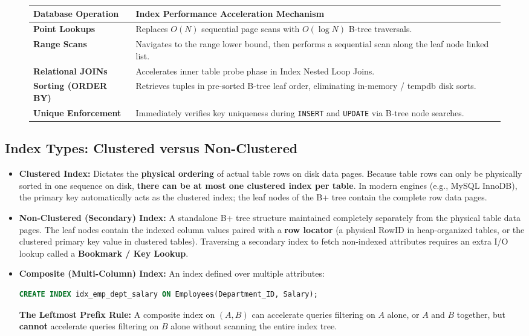 \begin{figure}[htbp]
\centering
\small
\begin{tabularx}{\textwidth}{p{3.5cm} X}
\toprule
\textbf{Database Operation} & \textbf{Index Performance Acceleration Mechanism} \\
\midrule
\textbf{Point Lookups} & Replaces $O(N)$ sequential page scans with $O(\log N)$ B-tree traversals. \\
\textbf{Range Scans} & Navigates to the range lower bound, then performs a sequential scan along the leaf node linked list. \\
\textbf{Relational JOINs} & Accelerates inner table probe phase in Index Nested Loop Joins. \\
\textbf{Sorting (ORDER BY)} & Retrieves tuples in pre-sorted B-tree leaf order, eliminating in-memory / tempdb disk sorts. \\
\textbf{Unique Enforcement} & Immediately verifies key uniqueness during \texttt{INSERT} and \texttt{UPDATE} via B-tree node searches. \\
\bottomrule
\end{tabularx}
\end{figure}

\subsection{Index Types: Clustered versus Non-Clustered}
\begin{itemize}
    \item \textbf{Clustered Index:} Dictates the \textbf{physical ordering} of actual table rows on disk data pages. Because table rows can only be physically sorted in one sequence on disk, \textbf{there can be at most one clustered index per table}. In modern engines (e.g., MySQL InnoDB), the primary key automatically acts as the clustered index; the leaf nodes of the B+ tree contain the complete row data pages.
    \item \textbf{Non-Clustered (Secondary) Index:} A standalone B+ tree structure maintained completely separately from the physical table data pages. The leaf nodes contain the indexed column values paired with a \textbf{row locator} (a physical RowID in heap-organized tables, or the clustered primary key value in clustered tables). Traversing a secondary index to fetch non-indexed attributes requires an extra I/O lookup called a \textbf{Bookmark / Key Lookup}.
    \item \textbf{Composite (Multi-Column) Index:} An index defined over multiple attributes:
\begin{lstlisting}[language=SQL]
CREATE INDEX idx_emp_dept_salary ON Employees(Department_ID, Salary);
\end{lstlisting}
    \textbf{The Leftmost Prefix Rule:} A composite index on $(A, B)$ can accelerate queries filtering on $A$ alone, or $A$ and $B$ together, but \textbf{cannot} accelerate queries filtering on $B$ alone without scanning the entire index tree.
\end{itemize}

